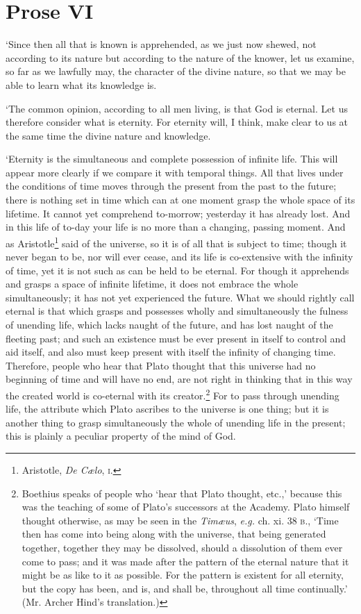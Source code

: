 \section*{Prose VI}

`Since then all that is known is apprehended, as we just now shewed,
not according to its nature but according to the nature of the knower,
let us examine, so far as we lawfully may, the character of the divine
nature, so that we may be able to learn what its knowledge is.

`The common opinion, according to all men living, is that God is
eternal. Let us therefore consider what is eternity. For eternity
will, I think, make clear to us at the same time the divine nature and
knowledge.

`Eternity is the simultaneous and complete possession of infinite
life. This will appear more clearly if we compare it with temporal
 things. All that lives under the conditions of time moves
through the present from the past to the future; there is nothing set
in time which can at one moment grasp the whole space of its lifetime.
It cannot yet comprehend to-morrow; yesterday it has already lost. And
in this life of to-day your life is no more than a changing, passing
moment. And as Aristotle\footnote{Aristotle, \textit{De C\ae lo},
\textsc{i}.} said of the universe, so it is of all that is subject to
time; though it never began to be, nor will ever cease, and its life
is co-extensive with the infinity of time, yet it is not such as can
be held to be eternal. For though it apprehends and grasps a space of
infinite lifetime, it does not embrace the whole simultaneously; it
has not yet experienced the future. What we should rightly call
eternal is that which grasps and possesses wholly and simultaneously
the fulness of unending life, which lacks naught of the future, and
has lost naught of the fleeting past; and such an existence must be
ever present in itself to control and aid itself, and also must keep
present with itself the infinity of changing time. Therefore, people
who hear that Plato thought that this universe had no beginning of
time and will have no end, are not right in thinking that in this way
the created world is co-eternal with its creator.\footnote{Boethius
speaks of people who `hear that Plato thought, etc.,' because this was
the teaching of some of Plato's successors at the Academy. Plato
himself thought otherwise, as may be seen in the \textit{Tim\ae us},
\textit{e.g.} ch. xi. 38 \textsc{b}., `Time then has come into being
along with the universe, that being generated together, together they
may be dissolved, should a dissolution of them ever come to pass; and
it was made after the pattern of the eternal nature that it might be
as like to it as possible. For the pattern is existent for all
eternity, but the copy has been, and is, and shall be, throughout all
time continually.' (Mr. Archer Hind's translation.)}  For to
pass through unending life, the attribute which Plato ascribes to the
universe is one thing; but it is another thing to grasp simultaneously
the whole of unending life in the present; this is plainly a peculiar
property of the mind of God.

